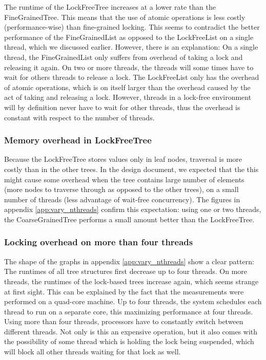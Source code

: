 \documentclass[a4paper]{article}
\begin{document}
The runtime of the LockFreeTree increases at a lower rate than the
FineGrainedTree. This means that the use of atomic operations is less costly
(performance-wise) than fine-grained locking. This seems to contradict the
better performance of the FineGrainedList as opposed to the LockFreeList on a
single thread, which we discussed earlier. However, there is an explanation:
On a single thread, the FineGrainedList only suffers from overhead of taking a
lock and releasing it again. On two or more threads, the threads will
some times have to wait for others threads to release a lock. The LockFreeList
only has the overhead of atomic operations, which is on itself larger than the
overhead caused by the act of taking and releasing a lock. However, threads in
a lock-free environment will by definition never have to wait for other
threads, thus the overhead is constant with respect to the number of threads.

\subsubsection*{Memory overhead in LockFreeTree}

Because the LockFreeTree stores values only in leaf nodes, traversal is more
costly than in the other trees. In the design document, we expected that the
this might cause some overhead when the tree contains large number of elements
(more nodes to traverse through as opposed to the other trees), on a small
number of threads (less advantage of wait-free concurrency). The figures in
appendix \ref{app:vary_nthreads} confirm this expectation: using one or two
threads, the CoarseGrainedTree performs a small amount better than the
LockFreeTree.

\subsubsection*{Locking overhead on more than four threads}

The shape of the graphs in appendix \ref{app:vary_nthreads} show a clear
pattern: The runtimes of all tree structures first decrease up to four threads.
On more threads, the runtimes of the lock-based trees increase again, which
seems strange at first sight. This can be explained by the fact that the
measurements were performed on a quad-core machine. Up to four threads, the
system schedules each thread to run on a separate core, this maximizing
performance at four threads. Using more than four threads, processors have to
constantly switch between different threads. Not only is this an expensive
operation, but it also comes with the possibility of some thread which is
holding the lock being suspended, which will block all other threads waiting
for that lock as well.
\end{document}

